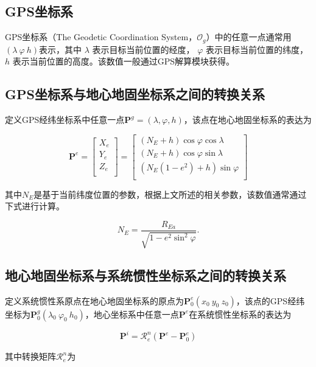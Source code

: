 \subsection{GPS坐标系}
GPS坐标系（The Geodetic Coordination System，$\mathcal{O}_g$）中的任意一点通常用$(\lambda\ \varphi\ h)$表示，其中 $\lambda$ 表示目标当前位置的经度， $\varphi$ 表示目标当前位置的纬度， $h$ 表示当前位置的高度。该数值一般通过GPS解算模块获得。

\subsection{GPS坐标系与地心地固坐标系之间的转换关系}
定义GPS经纬坐标系中任意一点$\mathbf{P}^g=(\lambda, \varphi, h)$，该点在地心地固坐标系的表达为

\begin{equation}
\textbf{P}^e
=
\left[\begin{array}{c}
X_e\\
Y_e\\
Z_e\\
\end{array}\right]
=
\left[\begin{array}{c}
(N_E+h)\cos \varphi \cos \lambda\\
(N_E+h)\cos \varphi \sin \lambda\\
(N_E(1-e^2)+h)\sin \varphi\\
\end{array}\right]
\end{equation}

其中$N_E$是基于当前纬度位置的参数，根据上文所述的相关参数，该数值通常通过下式进行计算。

\begin{equation}
N_E=\frac{R_{Ea}}{\sqrt{1-e^2 \sin^2 \varphi}}.
\end{equation}

\subsection{地心地固坐标系与系统惯性坐标系之间的转换关系}
定义系统惯性系原点在地心地固坐标系的原点为$\mathbf{P}_0^e(x_0\ y_0\ z_0)$，该点的GPS经纬坐标为$\mathbf{P}_0^g(\lambda_0\ \varphi_0\ h_0)$，地心坐标系中任意一点$\mathbf{P}^e$在系统惯性坐标系的表达为

\begin{equation}
\textbf{P}^i=\mathcal{R}_e^n(\textbf{P}^e - \textbf{P}_0^e)
\end{equation}

其中转换矩阵$\mathcal{R}_e^n$为

